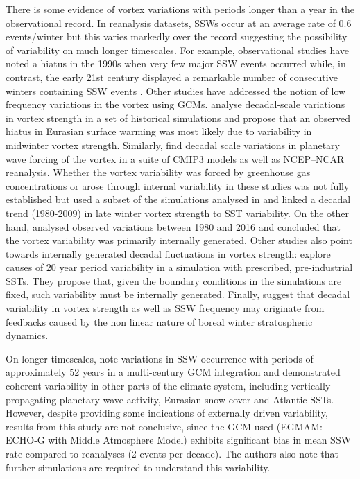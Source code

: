 There is some evidence of vortex variations with periods longer than a year in the observational record. In reanalysis datasets, SSWs occur at an average rate of 0.6 events/winter but this varies markedly over the record \citep{Butler2015} suggesting the possibility of variability on much longer timescales. For example, observational studies have noted a hiatus in the 1990s when very few major SSW events occurred \citep{Butler2015,Pawson1999,Shindell1999} while, in contrast, the early 21st century displayed a remarkable number of consecutive winters containing SSW events \citep{Manney2005}. Other studies have addressed the notion of low frequency variations in the vortex using GCMs. \cite{Garfinkel2017} analyse decadal-scale variations in vortex strength in a set of historical simulations and propose that an observed hiatus in Eurasian surface warming was most likely due to variability in midwinter vortex strength. Similarly, \cite{cohen2009} find decadal scale variations in planetary wave forcing of the vortex in a suite of CMIP3 models as well as NCEP–NCAR reanalysis. Whether the vortex variability was forced by greenhouse gas concentrations or arose through internal variability in these studies was not fully established but \cite{Garfinkel2015} used a subset of the simulations analysed in \cite{Garfinkel2017} and linked a decadal trend (1980-2009) in late winter vortex strength to SST variability. On the other hand, \cite{Seviour2017} analysed observed variations between 1980 and 2016 and concluded that the vortex variability was primarily internally generated. Other studies also point towards internally generated decadal fluctuations in vortex strength: \cite{manziniStratospheretroposphere2012} explore causes of 20 year period variability in a simulation with prescribed, pre-industrial SSTs. They propose that, given the boundary conditions in the simulations are fixed, such variability must be internally generated. Finally, \cite{Butchart2000} suggest that decadal variability in vortex strength as well as SSW frequency may originate from feedbacks caused by the non linear nature of boreal winter stratospheric dynamics.

On longer timescales, \cite{Schimanke2011} note variations in SSW occurrence with periods of approximately 52 years in a multi-century GCM integration and demonstrated coherent variability in other parts of the climate system, including vertically propagating planetary wave activity, Eurasian snow cover and Atlantic SSTs. However, despite providing some indications of externally driven variability, results from this study are not conclusive, since the GCM used (EGMAM: ECHO‐G with Middle Atmosphere Model) exhibits significant bias in mean SSW rate compared to reanalyses (2 events per decade). The authors also note that further simulations are required to understand this variability. 

